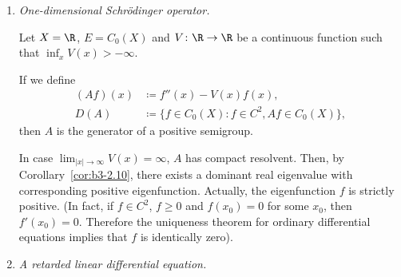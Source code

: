 \begin{example}\label{ex:b3-2.14}
%


\begin{enumerate}[\upshape (i), wide, labelindent=.25em]
	\item \emph{One-dimensional Schrödinger operator.}

	Let $X = \R$, $E = C_{0}(X)$ and $V \colon \R \to \R$ be a continuous function such that $\inf_{x} V(x) > -\infty$.
	
	If we define
	\begin{equation}\label{eq:b3-2.22}
		\begin{aligned}
			(Af)(x) &\coloneqq f''(x) - V(x)f(x), \\
			D(A) &\coloneqq \{f \in C_{0}(X) \colon f \in C^{2}, Af \in C_{0}(X)\},
		\end{aligned}
	\end{equation}
	then $A$ is the generator of a positive semigroup.
	
	In case $\lim_{|x| \to \infty}V(x) = \infty$, $A$ has compact resolvent.
	Then, by Corollary~\ref{cor:b3-2.10}, there exists a dominant real eigenvalue with corresponding positive eigenfunction.
	Actually, the eigenfunction $f$ is strictly positive. 
    (In fact, if\/ $f \in C^{2}$, $f \geq 0$ and $f(x_{0}) = 0$ for some $x_{0}$, then $f'(x_{0}) = 0$.
	Therefore the uniqueness theorem for ordinary differential equations implies that $f$ is identically zero).
	
\item \emph{A retarded linear differential equation.}


\end{enumerate}
\end{example}

